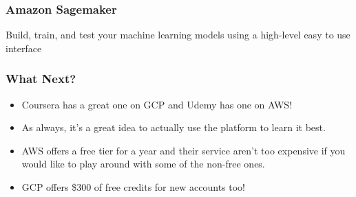 \begin{frame}\frametitle{Amazon Sagemaker}
Build, train, and test your machine learning models using a high-level easy to use interface
\end{frame}

\begin{frame}\frametitle{What Next?}
\begin{itemize}
\item Coursera has a great one on GCP and Udemy has one on AWS! 
\item As always, it’s a great idea to actually use the platform to learn it best. 
\item AWS offers a free tier for a year and their service aren’t too expensive if you would like to play around with some of the non-free ones. 
\item GCP offers \$300 of free credits for new accounts too!
\end{itemize}

\end{frame}